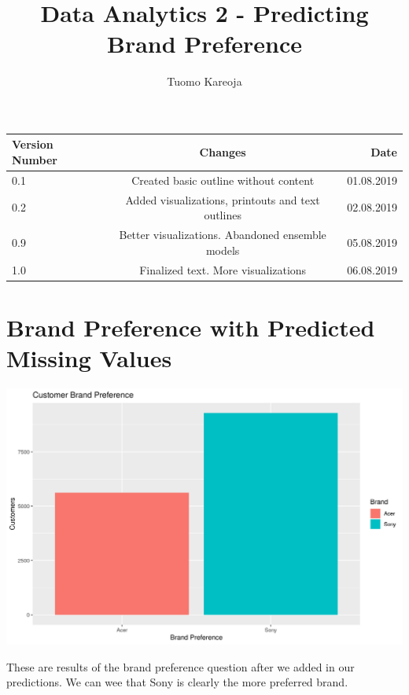 \documentclass[12pt,a4paper,leqno]{report}
\title{Data Analytics 2 - Predicting Brand Preference}
\author{Tuomo Kareoja}
\date{}
\theoremstyle{plain}
\theoremstyle{definition}
\theoremstyle{remark}
\begin{document}
\maketitle

\begin{table}[h!]
  \begin{center}
    \begin{tabular}{l|c|r}
      \textbf{Version Number} & \textbf{Changes} & \textbf{Date} \\
      \hline
      0.1 & Created basic outline without content & 01.08.2019\\
      0.2 & Added visualizations, printouts and text outlines & 02.08.2019\\
      0.9 & Better visualizations. Abandoned ensemble models & 05.08.2019\\
      1.0 & Finalized text. More visualizations & 06.08.2019\\
    \end{tabular}
  \end{center}
\end{table}

\newpage

\section{Brand Preference with Predicted Missing Values}

\bigskip
{
    \centering
    \includegraphics[width=\textwidth,height=\textheight,keepaspectratio]{brand_preference_plain.png}
    \par
}
\bigskip

These are results of the brand preference question after we added in our predictions. We can wee that Sony
is clearly the more preferred brand.
\end{document}
